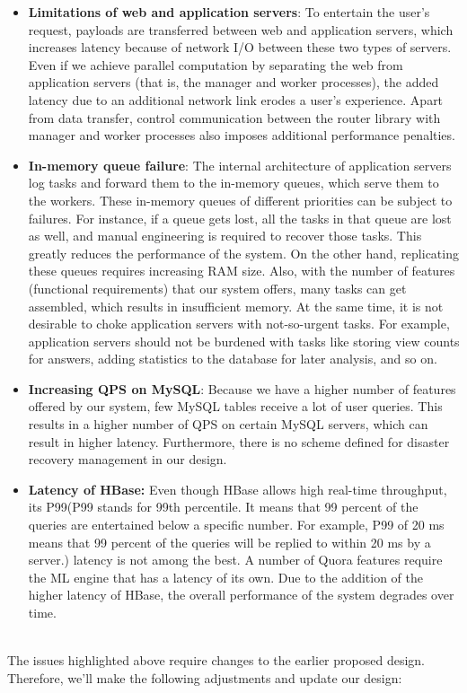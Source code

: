 \begin{itemize}
\item
\protect{}\label{KRUOQtXzhSmVh6AdnXPGE}
\textbf{Limitations of web and application servers}: To entertain the user's request, payloads are transferred between web and application servers, which increases latency because of network I/O between these two types of servers. Even if we achieve parallel computation by separating the web from application servers (that is, the manager and worker processes), the added latency due to an additional network link erodes a user's experience. Apart from data transfer, control communication between the router library with manager and worker processes also imposes additional performance penalties.
\item
\protect{}\label{ZI6MjziG_3lppjuPpzQk4}
\textbf{In-memory queue failure}: The internal architecture of application servers log tasks and forward them to the in-memory queues, which serve them to the workers. These in-memory queues of different priorities can be subject to failures. For instance, if a queue gets lost, all the tasks in that queue are lost as well, and manual engineering is required to recover those tasks. This greatly reduces the performance of the system. On the other hand, replicating these queues requires increasing RAM size. Also, with the number of features (functional requirements) that our system offers, many tasks can get assembled, which results in insufficient memory. At the same time, it is not desirable to choke application servers with not-so-urgent tasks. For example, application servers should not be burdened with tasks like storing view counts for answers, adding statistics to the database for later analysis, and so on.
\item
\protect{}\label{s52vsc9CdH3ovLiBh2NpV}
\textbf{Increasing QPS on MySQL}: Because we have a higher number of features offered by our system, few MySQL tables receive a lot of user queries. This results in a higher number of QPS on certain MySQL servers, which can result in higher latency. Furthermore, there is no scheme defined for disaster recovery management in our design.
\item
\protect{}\label{xi2MNZpowmUvdji63Kou1}
\textbf{Latency of HBase:} Even though HBase allows high real-time throughput, its P99(P99 stands for 99th percentile. It means that 99 percent of the queries are entertained below a specific number. For example, P99 of 20 ms means that 99 percent of the queries will be replied to within 20 ms by a server.) latency is not among the best. A number of Quora features require the ML engine that has a latency of its own. Due to the addition of the higher latency of HBase, the overall performance of the system degrades over time.
\end{itemize}
\\
The issues highlighted above require changes to the earlier proposed design. Therefore, we'll make the following adjustments and update our design:

